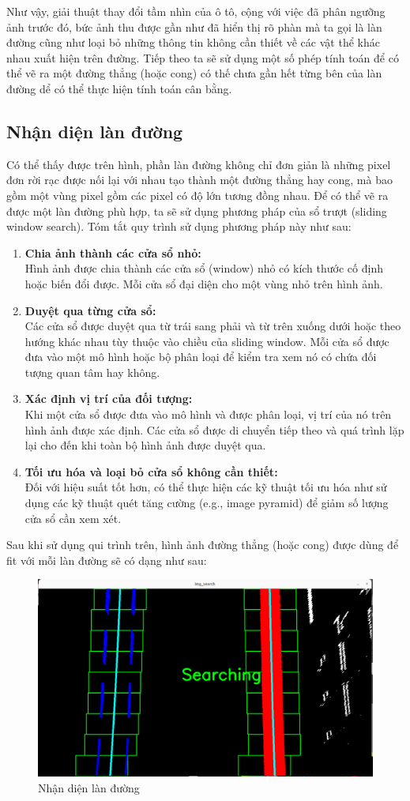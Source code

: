\noindent Như vậy, giải thuật thay đổi tầm nhìn của ô tô, cộng với việc đã phân ngưỡng ảnh trước đó, bức ảnh thu được gần như đã hiển thị rõ phàn mà ta gọi là làn đường cũng như loại bỏ những thông tin không cần thiết về các vật thể khác nhau xuất hiện trên đường. Tiếp theo ta sẽ sử dụng một số phép tính toán để có thể vẽ ra một đường thẳng (hoặc cong) có thế chưa gần hết từng bên của làn đường dể có thể thực hiện tính toán cân bằng. 

\subsection{Nhận diện làn đường}
Có thể thấy được trên hình, phần làn đường không chỉ đơn giản là những pixel đơn rời rạc được nối lại với nhau tạo thành một đường thẳng hay cong, mà bao gồm một vùng pixel gồm các pixel có độ lớn tương đồng nhau. Để có thể vẽ ra được một làn đường phù hợp, ta sẽ sử dụng phương pháp của sổ trượt (sliding window search). Tóm tắt quy trình sử dụng phương pháp này như sau:
\begin{enumerate}
    \item \textbf{Chia ảnh thành các cửa sổ nhỏ:}\\ Hình ảnh được chia thành các cửa sổ (window) nhỏ có kích thước cố định hoặc biến đổi được. Mỗi cửa sổ đại diện cho một vùng nhỏ trên hình ảnh.
    \item \textbf{Duyệt qua từng cửa sổ:}\\ Các cửa sổ được duyệt qua từ trái sang phải và từ trên xuống dưới hoặc theo hướng khác nhau tùy thuộc vào chiều của sliding window. Mỗi cửa sổ được đưa vào một mô hình hoặc bộ phân loại để kiểm tra xem nó có chứa đối tượng quan tâm hay không.
    \item \textbf{Xác định vị trí của đối tượng:}\\ Khi một cửa sổ được đưa vào mô hình và được phân loại, vị trí của nó trên hình ảnh được xác định. Các cửa sổ được di chuyển tiếp theo và quá trình lặp lại cho đến khi toàn bộ hình ảnh được duyệt qua.
    \item \textbf{Tối ưu hóa và loại bỏ cửa sổ không cần thiết:}\\ Đối với hiệu suất tốt hơn, có thể thực hiện các kỹ thuật tối ưu hóa như sử dụng các kỹ thuật quét tăng cường (e.g., image pyramid) để giảm số lượng cửa sổ cần xem xét.
    
\end{enumerate}
Sau khi sử dụng qui trình trên, hình ảnh đường thẳng (hoặc cong) được dùng để fit với mỗi làn đường sẽ có dạng như sau:
\begin{figure}[htbp]
    \centering
    \includegraphics[width=0.6\linewidth]{images/3-lane/sliding.png}
    \caption{Nhận diện làn đường}
\end{figure}
